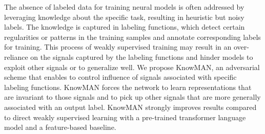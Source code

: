 The absence of labeled data for training neural models is often addressed by leveraging knowledge about the specific task, resulting in heuristic but noisy labels. The knowledge is captured in labeling functions, which detect certain regularities or patterns in the training samples and annotate corresponding labels for training. This process of weakly supervised training may result in an over-reliance on the signals captured by the labeling functions and hinder models to exploit other signals or to generalize well. We propose KnowMAN, an adversarial scheme that enables to control influence of signals associated with specific labeling functions. KnowMAN forces the network to learn representations that are invariant to those signals and to pick up other signals that are more generally associated with an output label. KnowMAN strongly improves results compared to direct weakly supervised learning with a pre-trained transformer language model and a feature-based baseline.
